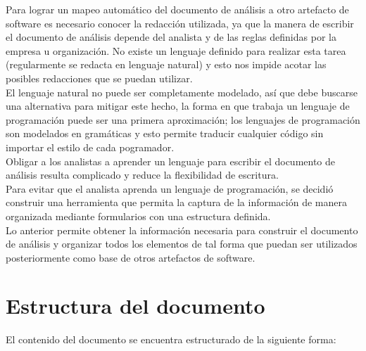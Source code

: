 Para lograr un mapeo automático del documento de análisis a otro artefacto de software es necesario conocer la redacción utilizada, ya que la manera de escribir 
el documento de análisis depende del analista y de las reglas definidas por la empresa u organización. No existe un lenguaje definido para realizar esta tarea
(regularmente se redacta en lenguaje natural) y esto nos impide acotar las posibles redacciones que se puedan utilizar.\\

El lenguaje natural no puede ser completamente modelado, así que debe buscarse una alternativa para mitigar este hecho, la forma en que trabaja un lenguaje de programación 
puede ser una primera aproximación; los lenguajes de programación son modelados en gramáticas y esto permite traducir cualquier código sin importar el estilo de cada pogramador. \\

Obligar a los analistas a aprender un lenguaje para escribir el documento de análisis resulta complicado y reduce la flexibilidad de escritura. \\

Para evitar que el analista aprenda un lenguaje de programación, se decidió construir una herramienta que permita la
captura de la información de manera organizada mediante formularios con una
estructura definida.\\

Lo anterior permite obtener la información necesaria para construir el documento de análisis y 
organizar todos los elementos de tal forma que puedan ser utilizados posteriormente como base de otros 
artefactos de software.\\

\section{Estructura del documento}

	El contenido del documento se encuentra estructurado de la siguiente forma:

